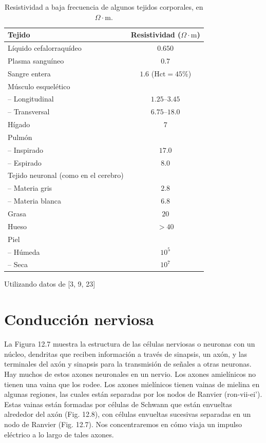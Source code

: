 \documentclass[12pt]{book}
\begin{document}
\begin{table}[htbp]
\centering
\caption{Resistividad a baja frecuencia de algunos tejidos corporales, en $\Omega\cdot\text{m}$.}
\label{tab:12.4}
\begin{tabularx}{\textwidth}{X c}
\toprule
Tejido & Resistividad ($\Omega\cdot\text{m}$) \\
\midrule
Líquido cefalorraquídeo & $0.650$ \\
Plasma sanguíneo & $0.7$ \\
Sangre entera & $1.6$ ($\text{Hct} = 45\%$) \\
Músculo esquelético & \\
\quad -- Longitudinal & $1.25\text{--}3.45$ \\
\quad -- Transversal & $6.75\text{--}18.0$ \\
Hígado & $7$ \\
Pulmón & \\
\quad -- Inspirado & $17.0$ \\
\quad -- Espirado & $8.0$ \\
Tejido neuronal (como en el cerebro) & \\
\quad -- Materia gris & $2.8$ \\
\quad -- Materia blanca & $6.8$ \\
Grasa & $20$ \\
Hueso & $>40$ \\
Piel & \\
\quad -- Húmeda & $10^5$ \\
\quad -- Seca & $10^7$ \\
\bottomrule
\end{tabularx}
\addvspace{5pt}
\raggedright\small Utilizando datos de [3, 9, 23]
\end{table}

\section{Conducción nerviosa}

La Figura 12.7 muestra la estructura de las células nerviosas o neuronas con un núcleo, dendritas que reciben información a través de sinapsis, un axón, y las terminales del axón y sinapsis para la transmisión de señales a otras neuronas. Hay muchos de estos axones neuronales en un nervio. Los axones amielínicos no tienen una vaina que los rodee. Los axones mielínicos tienen vainas de mielina en algunas regiones, las cuales están separadas por los nodos de Ranvier (ron-vii-ei'). Estas vainas están formadas por células de Schwann que están envueltas alrededor del axón (Fig. 12.8), con células envueltas sucesivas separadas en un nodo de Ranvier (Fig. 12.7). Nos concentraremos en cómo viaja un impulso eléctrico a lo largo de tales axones.
\end{document}
